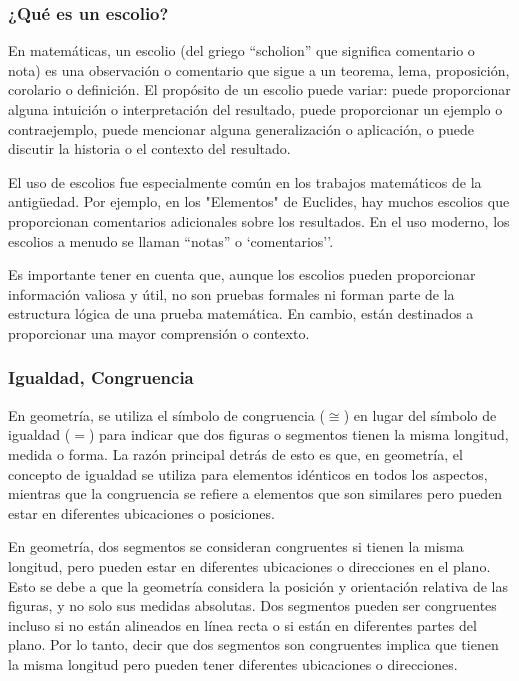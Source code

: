 \subsubsection{¿Qué es un escolio?}

En matemáticas, un escolio (del griego ``scholion'' que significa comentario o nota) es una observación o comentario que sigue a un teorema, lema, proposición, corolario o definición. El propósito de un escolio puede variar: puede proporcionar alguna intuición o interpretación del resultado, puede proporcionar un ejemplo o contraejemplo, puede mencionar alguna generalización o aplicación, o puede discutir la historia o el contexto del resultado.

El uso de escolios fue especialmente común en los trabajos matemáticos de la antigüedad. Por ejemplo, en los "Elementos" de Euclides, hay muchos escolios que proporcionan comentarios adicionales sobre los resultados. En el uso moderno, los escolios a menudo se llaman ``notas'' o `comentarios''.

Es importante tener en cuenta que, aunque los escolios pueden proporcionar información valiosa y útil, no son pruebas formales ni forman parte de la estructura lógica de una prueba matemática. En cambio, están destinados a proporcionar una mayor comprensión o contexto.

\subsubsection{Igualdad, Congruencia}

En geometría, se utiliza el símbolo de congruencia ($\cong$) en lugar del símbolo de igualdad ($=$) para indicar que dos figuras o segmentos tienen la misma longitud, medida o forma. La razón principal detrás de esto es que, en geometría, el concepto de igualdad se utiliza para elementos idénticos en todos los aspectos, mientras que la congruencia se refiere a elementos que son similares pero pueden estar en diferentes ubicaciones o posiciones.

En geometría, dos segmentos se consideran congruentes si tienen la misma longitud, pero pueden estar en diferentes ubicaciones o direcciones en el plano. Esto se debe a que la geometría considera la posición y orientación relativa de las figuras, y no solo sus medidas absolutas. Dos segmentos pueden ser congruentes incluso si no están alineados en línea recta o si están en diferentes partes del plano. Por lo tanto, decir que dos segmentos son congruentes implica que tienen la misma longitud pero pueden tener diferentes ubicaciones o direcciones.

